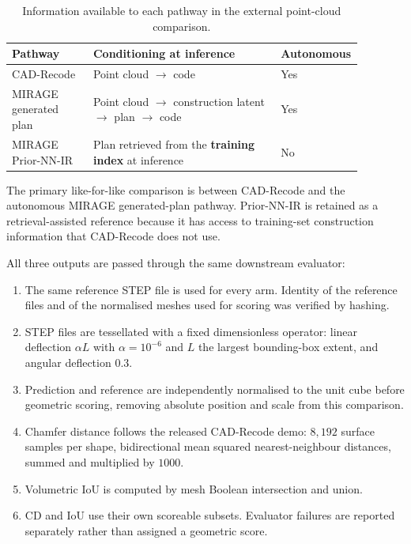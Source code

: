 \documentclass[preprint,12pt]{elsarticle}
\begin{document}
\begin{table}[htbp]
  \centering
  \footnotesize
  \caption{Information available to each pathway in the external point-cloud
    comparison.}
  \label{tab:external_information}

  \begin{tabular}{
      >{\raggedright\arraybackslash}p{0.23\linewidth}
      >{\raggedright\arraybackslash}p{0.53\linewidth}
      >{\centering\arraybackslash}p{0.12\linewidth}
    }
    \toprule
    Pathway
     & Conditioning at inference
     & Autonomous                                                   \\
    \midrule

    CAD-Recode
     & Point cloud $\rightarrow$ code
     & Yes                                                          \\

    MIRAGE generated plan
     & Point cloud $\rightarrow$ construction latent
    $\rightarrow$ plan $\rightarrow$ code
     & Yes                                                          \\

    MIRAGE Prior-NN-IR
     & Plan retrieved from the \textbf{training index} at inference
     & No                                                           \\

    \bottomrule
  \end{tabular}
\end{table}

The primary like-for-like comparison is between CAD-Recode and the autonomous
MIRAGE generated-plan pathway. Prior-NN-IR is retained as a retrieval-assisted
reference because it has access to training-set construction information that
CAD-Recode does not use.

All three outputs are passed through the same downstream evaluator:

\begin{enumerate}
  \item The same reference STEP file is used for every arm. Identity of the reference files and of the normalised meshes used for scoring was verified by hashing.
  \item STEP files are tessellated with a fixed dimensionless operator: linear deflection $\alpha L$ with $\alpha=10^{-6}$ and $L$ the largest bounding-box extent, and angular deflection $0.3$.
  \item Prediction and reference are independently normalised to the unit cube before geometric scoring, removing absolute position and scale from this comparison.
  \item Chamfer distance follows the released CAD-Recode demo: $8{,}192$ surface samples per shape, bidirectional mean squared nearest-neighbour distances, summed and multiplied by $1000$.
  \item Volumetric IoU is computed by mesh Boolean intersection and union.
  \item CD and IoU use their own scoreable subsets. Evaluator failures are reported separately rather than assigned a geometric score.
\end{enumerate}
\end{document}
